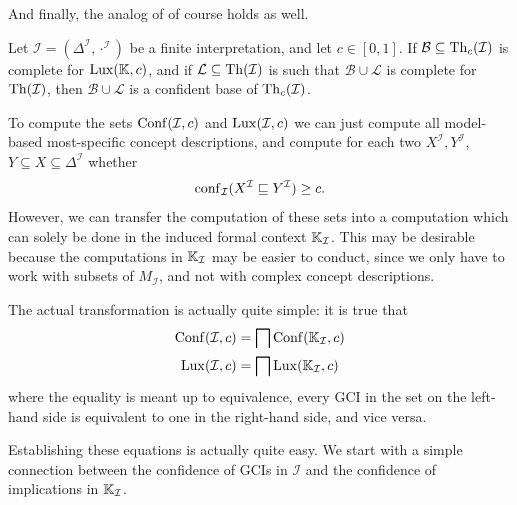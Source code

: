 And finally, the analog of  of course holds as well.

\begin{Corollary}
  \label{cor:weakened-luxenburger-base-for-gcis}
  Let $\mathcal{I} = (\Delta^{\mathcal{I}}, \cdot^{\mathcal{I}})$ be a finite
  interpretation, and let $c \in [0,1]$.  If $\mathcal{B} \subseteq \operatorname{Th}_c(\mathcal{I})$ is
  complete for $\operatorname{Lux}({\mathbb{K}}, c)$, and if $\mathcal{L} \subseteq \operatorname{Th}(\mathcal{I})$ is such
  that $\mathcal{B} \cup \mathcal{L}$ is complete for $\operatorname{Th}(\mathcal{I})$, then
  $\mathcal{B} \cup \mathcal{L}$ is a confident base of $\operatorname{Th}_c(\mathcal{I})$.
\end{Corollary}

To compute the sets $\operatorname{Conf}(\mathcal{I}, c)$ and $\operatorname{Lux}(\mathcal{I}, c)$ we can just compute
all model-based most-specific concept descriptions, and compute for each two
$X^{\mathcal{I}}, Y^{\mathcal{I}}$, $Y \subseteq X \subseteq \Delta^{\mathcal{I}}$ whether
\begin{equation*}
  \operatorname{conf}_{\mathcal{I}}(X^{\mathcal{I}} \sqsubseteq Y^{\mathcal{I}}) \ge c.
\end{equation*}
However, we can transfer the computation of these sets into a computation which can solely
be done in the induced formal context ${\mathbb{K}}_{\mathcal{I}}$.  This may be desirable
because the computations in ${\mathbb{K}}_{\mathcal{I}}$ may be easier to conduct, since we only
have to work with subsets of $M_{\mathcal{I}}$, and not with complex concept descriptions.

The actual transformation is actually quite simple: it is true that
\begin{equation}
  \label{eq:31}
  \begin{aligned}
    \operatorname{Conf}(\mathcal{I}, c) &= \bigsqcap \operatorname{Conf}({\mathbb{K}}_{\mathcal{I}}, c) \\
    \operatorname{Lux}(\mathcal{I}, c) &= \bigsqcap \operatorname{Lux}({\mathbb{K}}_{\mathcal{I}}, c)
  \end{aligned}
\end{equation}
where the equality is meant up to equivalence, \ie every GCI in the set on the left-hand
side is equivalent to one in the right-hand side, and vice versa.

Establishing these equations is actually quite easy.  We start with a simple connection
between the confidence of GCIs in $\mathcal{I}$ and the confidence of implications in
${\mathbb{K}}_{\mathcal{I}}$.

